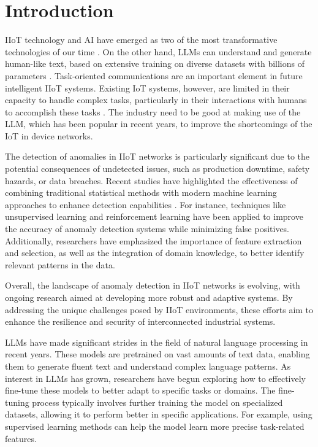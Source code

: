 \documentclass[usenatbib]{tjaa}
\begin{document}

\section{Introduction}
IIoT technology and AI have
emerged as two of the most transformative technologies of our
time \citep{zuo2024federated}.
On the other hand,
LLMs can understand and generate
human-like text, based on extensive training on diverse datasets
with billions of parameters \citep{kalita2024large}.
Task-oriented communications are an important
element in future intelligent IIoT systems. Existing IoT systems,
however, are limited in their capacity to handle complex tasks,
particularly in their interactions with humans to accomplish these
tasks \citep{cui2024llmind}. 
The industry need to be good at making use of the LLM,
which has been popular in recent years, to improve
the shortcomings of the IoT in device networks.

The detection of anomalies in IIoT networks is particularly significant
due to the potential consequences of undetected issues,
such as production downtime, safety hazards, or data breaches.
Recent studies have highlighted the effectiveness of combining
traditional statistical methods with modern machine learning approaches
to enhance detection capabilities \citep{9034736}.
For instance, techniques like unsupervised learning and reinforcement
learning have been applied to improve the accuracy of anomaly
detection systems while minimizing false positives.
Additionally, researchers have emphasized the importance of
feature extraction and selection, as well as the integration of
domain knowledge, to better identify relevant patterns in the data.

Overall, the landscape of anomaly detection in IIoT networks is evolving,
with ongoing research aimed at developing more robust and adaptive
systems. By addressing the unique challenges posed by IIoT environments,
these efforts aim to enhance the resilience and security of
interconnected industrial systems.

LLMs have made significant strides
in the field of natural language processing in recent years.
These models are pretrained on vast amounts of text data,
enabling them to generate fluent text and understand complex
language patterns. As interest in LLMs has grown,
researchers have begun exploring how to effectively fine-tune
these models to better adapt to specific tasks or domains.
The fine-tuning process typically involves further training the model
on specialized datasets, allowing it to perform better in specific
applications. For example, using supervised learning methods can
help the model learn more precise task-related features\citep{chen2020big}.
\end{document}
